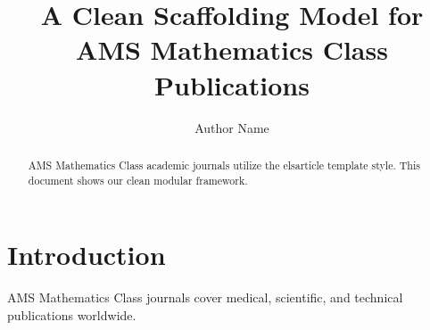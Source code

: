 \documentclass[preprint,12pt]{elsarticle}
\begin{document}
\begin{frontmatter}

\title{A Clean Scaffolding Model for AMS Mathematics Class Publications}
\author{Author Name}
\address{Engineering Research Center, AMS Mathematics Class University}

\begin{abstract}
AMS Mathematics Class academic journals utilize the elsarticle template style. This document shows our clean modular framework.
\end{abstract}

\end{frontmatter}

\section{Introduction}
AMS Mathematics Class journals cover medical, scientific, and technical publications worldwide.
\end{document}
